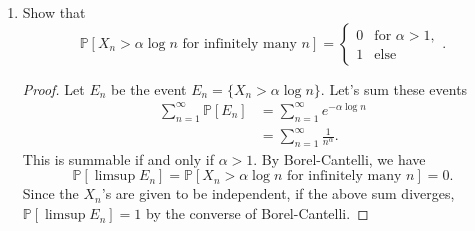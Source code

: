\documentclass[11pt,letterpaper]{report}
\newcommand{\E}{\mathbb{E}}
\newcommand{\prob}{\mathbb{P}}{}
\newcommand{\Var}{\text{Var}}
\newenvironment{solution}
{\begin{proof}[Solution]}
{\end{proof}}
\begin{document}
\begin{enumerate}
\begin{enumerate}
\begin{solution}
			\noindent Let $Y = X_n+X_{n+1}$. We'll need the mean and variance of $Y$ to compute the correlation coefficient.
			\begin{align*}
				\E[Y] &= \E[X_n] + \E[X_{n+1}] = 2.
			\end{align*}
			Since $X_n$ and $X_{n+1}$ are independent, we also have
			\[
			\Var[Y] = \Var[X_n] + \Var[X_{n+1}] = 2.
			\]
			Now let's compute the correlation coefficient.
			\begin{align*}
				\rho_{Y, X_{n+1}} &= \frac{\E[(Y - \mu_Y)(X_{n+1} - \mu_{n+1})]}{\sigma_Y\sigma_{n+1}}\\
				&= \frac{\E[YX_{n+1}] - \mu_{n+1}\E[Y] - \mu_Y\E[X_{n+1}]  +\mu_Y\mu_{n+1}}{\sqrt{2}}\\
				&= \frac{\E[X_nX_{n+1}] + \E[X_{n+1}^2]-2-2+2}{\sqrt{2}}\\
				&= \frac{1}{\sqrt{2}}.
			\end{align*}
			Now for the conditional expectation. Since conditional expectation is linear and $X_n$ and $X_{n+1}$ are independent,
			\begin{align*}
				\E[Y|X_{n+1}] &= \E[X_n|X_{n+1}] + \E[X_{n+1}|X_{n+1}]\\
				&= \E[X_n] + X_{n+1}\\
				&= 1+X_{n+1}.
			\end{align*}
		\end{solution}
		\item Show that
		\[
		\prob[X_n > \alpha \log n\text{ for infinitely many }n] = \begin{cases}
			0&\text{for }\alpha>1,\\
			1&\text{else}
		\end{cases}.
		\]
		\begin{proof}
			Let $E_n$ be the event $E_n = \{X_n > \alpha \log n\}$. Let's sum these events
			\begin{align*}
				\sum_{n=1}^\infty \prob[E_n] &= \sum_{n=1}^\infty e^{-\alpha \log n}\\
				&= \sum_{n=1}^\infty \frac{1}{n^\alpha}.
			\end{align*}
			This is summable if and only if $\alpha>1$. By Borel-Cantelli, we have
			\[
			\prob[\limsup E_n] = \prob[X_n>\alpha \log n\text{ for infinitely many }n] = 0.
			\]
			Since the $X_n$'s are given to be independent, if the above sum diverges, $\prob[\limsup E_n] = 1$ by the converse of Borel-Cantelli.
		\end{proof}
	\end{enumerate}


\end{enumerate}
\end{document}
